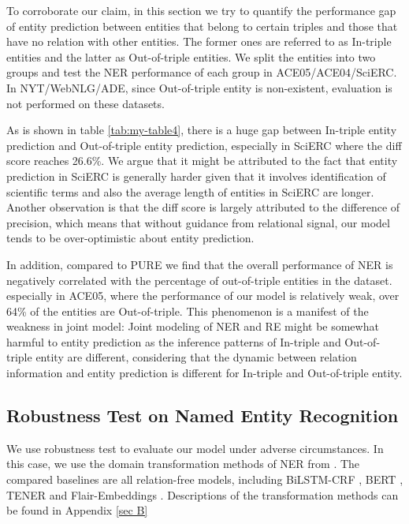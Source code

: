 \documentclass[11pt]{article}
\begin{document}
To corroborate our claim, in this section we try to quantify the performance gap of entity prediction between entities that belong to certain triples and those that have no relation with other entities. The former ones are referred to as In-triple entities and the latter as Out-of-triple entities. We split the entities into two groups and test the NER performance of each group in ACE05/ACE04/SciERC. In NYT/WebNLG/ADE, since Out-of-triple entity is non-existent, evaluation is not performed on these datasets.   

As is shown in table \ref{tab:my-table4}, there is a huge gap between In-triple entity prediction and Out-of-triple entity prediction, especially in SciERC where the diff score reaches 26.6\%. We argue that it might be attributed to the fact that entity prediction in SciERC is generally harder given that it involves identification of scientific terms and also the average length of entities in SciERC are longer. Another observation is that the diff score is largely attributed to the difference of precision, which means that without guidance from relational signal, our model tends to be over-optimistic about entity prediction.

In addition, compared to PURE \citep{zhong2021frustratingly} we find that the overall performance of NER is negatively correlated with the percentage of out-of-triple entities in the dataset. especially in ACE05, where the performance of our model is relatively weak, over 64\% of the entities are Out-of-triple. This phenomenon is a manifest of the weakness in joint model: Joint modeling of NER and RE might be somewhat harmful to entity prediction as the inference patterns of In-triple and Out-of-triple entity are different, considering that the dynamic between relation information and entity prediction is different for In-triple and Out-of-triple entity.

\subsection{Robustness Test on Named Entity Recognition}
\label{6-2}
We use robustness test to evaluate our model under adverse circumstances. In this case, we use the domain transformation methods of NER from \citep{wang2021textflint}. The compared baselines are all relation-free models, including BiLSTM-CRF \citep{huang2015bidirectional}, BERT \citep{devlin2019bert}, TENER \citep{yan2019tener} and Flair-Embeddings \citep{akbik2019flair}. Descriptions of the transformation methods can be found in Appendix \ref{sec B}
\end{document}
